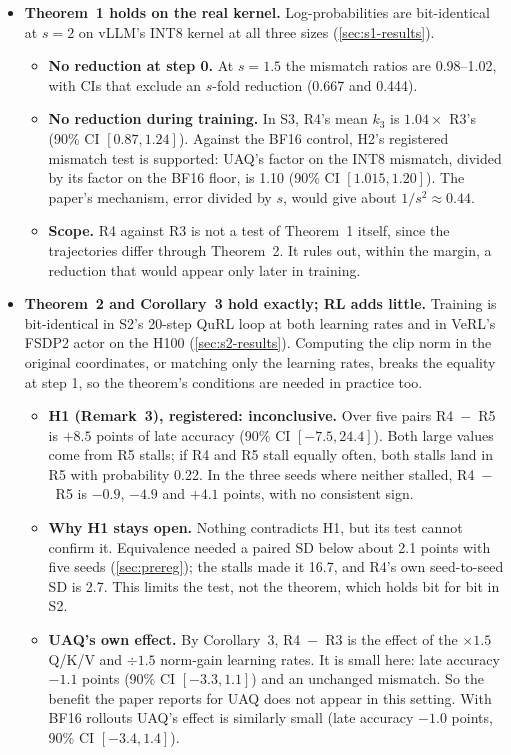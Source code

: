 \documentclass[11pt]{article}
\begin{document}
\begin{itemize}
\item \textbf{Theorem~1 holds on the real kernel.} Log-probabilities are bit-identical at $s=2$ on vLLM's INT8 kernel at all three sizes (\cref{sec:s1-results}).
  \begin{itemize}
  \item \textbf{No reduction at step 0.} At $s=1.5$ the mismatch ratios are 0.98--1.02, with CIs that exclude an $s$-fold reduction (0.667 and 0.444).
  \item \textbf{No reduction during training.} In S3, R4's mean $k_3$ is $1.04\times$ R3's (90\% CI $[0.87, 1.24]$). Against the BF16 control, H2's registered mismatch test is supported: UAQ's factor on the INT8 mismatch, divided by its factor on the BF16 floor, is 1.10 (90\% CI $[1.015, 1.20]$). The paper's mechanism, error divided by $s$, would give about $1/s^2\approx0.44$.
  \item \textbf{Scope.} R4 against R3 is not a test of Theorem~1 itself, since the trajectories differ through Theorem~2. It rules out, within the margin, a reduction that would appear only later in training.
  \end{itemize}
\item \textbf{Theorem~2 and Corollary~3 hold exactly; RL adds little.} Training is bit-identical in S2's 20-step QuRL loop at both learning rates and in VeRL's FSDP2 actor on the H100 (\cref{sec:s2-results}). Computing the clip norm in the original coordinates, or matching only the learning rates, breaks the equality at step 1, so the theorem's conditions are needed in practice too.
  \begin{itemize}
  \item \textbf{H1 (Remark~3), registered: inconclusive.} Over five pairs R4~$-$~R5 is $+8.5$ points of late accuracy (90\% CI $[-7.5, 24.4]$). Both large values come from R5 stalls; if R4 and R5 stall equally often, both stalls land in R5 with probability 0.22. In the three seeds where neither stalled, R4~$-$~R5 is $-0.9$, $-4.9$ and $+4.1$ points, with no consistent sign.
  \item \textbf{Why H1 stays open.} Nothing contradicts H1, but its test cannot confirm it. Equivalence needed a paired SD below about 2.1 points with five seeds (\cref{sec:prereg}); the stalls made it 16.7, and R4's own seed-to-seed SD is 2.7. This limits the test, not the theorem, which holds bit for bit in S2.
  \item \textbf{UAQ's own effect.} By Corollary~3, R4~$-$~R3 is the effect of the $\times1.5$ Q/K/V and $\div1.5$ norm-gain learning rates. It is small here: late accuracy $-1.1$ points (90\% CI $[-3.3, 1.1]$) and an unchanged mismatch. So the benefit the paper reports for UAQ does not appear in this setting. With BF16 rollouts UAQ's effect is similarly small (late accuracy $-1.0$ points, 90\% CI $[-3.4, 1.4]$).

\end{itemize}
\end{itemize}
\end{document}
